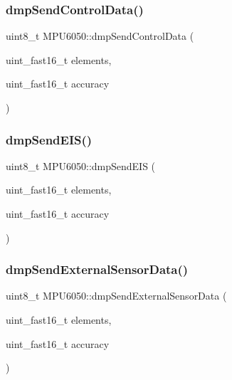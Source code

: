\mbox{\label{classMPU6050_a8e2e01f401333d24d8c6dbcaf069dcac}} 
\subsubsection{\texorpdfstring{dmpSendControlData()}{dmpSendControlData()}}
{\footnotesize\ttfamily uint8\+\_\+t M\+P\+U6050\+::dmp\+Send\+Control\+Data (\begin{DoxyParamCaption}\item[{uint\+\_\+fast16\+\_\+t}]{elements,  }\item[{uint\+\_\+fast16\+\_\+t}]{accuracy }\end{DoxyParamCaption})}

\mbox{\label{classMPU6050_a628d208cf85fcf46b3e100880e332e19}} 
\subsubsection{\texorpdfstring{dmpSendEIS()}{dmpSendEIS()}}
{\footnotesize\ttfamily uint8\+\_\+t M\+P\+U6050\+::dmp\+Send\+E\+IS (\begin{DoxyParamCaption}\item[{uint\+\_\+fast16\+\_\+t}]{elements,  }\item[{uint\+\_\+fast16\+\_\+t}]{accuracy }\end{DoxyParamCaption})}

\mbox{\label{classMPU6050_a9ab7129881263e634dee0d3b0ca802c4}} 
\subsubsection{\texorpdfstring{dmpSendExternalSensorData()}{dmpSendExternalSensorData()}}
{\footnotesize\ttfamily uint8\+\_\+t M\+P\+U6050\+::dmp\+Send\+External\+Sensor\+Data (\begin{DoxyParamCaption}\item[{uint\+\_\+fast16\+\_\+t}]{elements,  }\item[{uint\+\_\+fast16\+\_\+t}]{accuracy }\end{DoxyParamCaption})}

